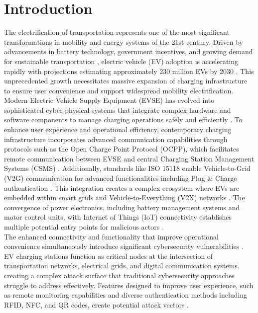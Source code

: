 \section{Introduction}
\label{section:introduction}
The electrification of transportation represents one of the most significant transformations in mobility and energy systems of the 21st century. Driven by advancements in battery technology, government incentives, and growing demand for sustainable transportation \cite{hawkins2012environmental}, electric vehicle (EV) adoption is accelerating rapidly with projections estimating approximately 230 million EVs by 2030 \cite{boudina2020review, sani2022privacy}. This unprecedented growth necessitates massive expansion of charging infrastructure to ensure user convenience and support widespread mobility electrification. \\

Modern Electric Vehicle Supply Equipment (EVSE) has evolved into sophisticated cyber-physical systems that integrate complex hardware and software components to manage charging operations safely and efficiently \cite{buedi2024enhancing}. To enhance user experience and operational efficiency, contemporary charging infrastructure incorporates advanced communication capabilities through protocols such as the Open Charge Point Protocol (OCPP), which facilitates remote communication between EVSE and central Charging Station Management Systems (CSMS) \cite{makhmudov2025online}. Additionally, standards like ISO 15118 enable Vehicle-to-Grid (V2G) communication for advanced functionalities including Plug \& Charge authentication \cite{naeem2025optimizing, buedi2024enhancing}. This integration creates a complex ecosystem where EVs are embedded within smart grids and Vehicle-to-Everything (V2X) networks \cite{makhmudov2025online}. The convergence of power electronics, including battery management systems and motor control units, with Internet of Things (IoT) connectivity establishes multiple potential entry points for malicious actors \cite{almadhor2025transfer}. \\

The enhanced connectivity and functionality that improve operational convenience simultaneously introduce significant cybersecurity vulnerabilities \cite{hamdare2023cybersecurity}. EV charging stations function as critical nodes at the intersection of transportation networks, electrical grids, and digital communication systems, creating a complex attack surface that traditional cybersecurity approaches struggle to address effectively. Features designed to improve user experience, such as remote monitoring capabilities and diverse authentication methods including RFID, NFC, and QR codes, create potential attack vectors \cite{antoun2020detailed}. \\

